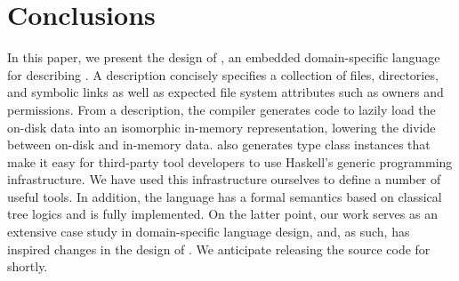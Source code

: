 \section{Conclusions}
\label{sec:conclusion}


In this paper, we present the design of \forest{}, an embedded
domain-specific language for describing \filestores{}.  A \forest{}
description concisely specifies a collection of files, directories,
and symbolic links as well as expected file system attributes such as
owners and permissions.  From a description, the \forest{} compiler
generates code to lazily load the on-disk data into an isomorphic
in-memory representation, lowering the divide between on-disk and
in-memory data.  
\forest{} also generates type class instances that make it 
easy for third-party tool developers to use
Haskell's generic programming infrastructure.  We have used this
infrastructure ourselves to define a number of useful tools. 
In addition, the language has a formal semantics based on classical tree logics and is
fully implemented.  On the latter point, our work 
serves as an extensive case study in domain-specific
language design, and, as such, has inspired changes in the design of
\template{}.  We anticipate releasing the 
source code for \forest{} shortly.
